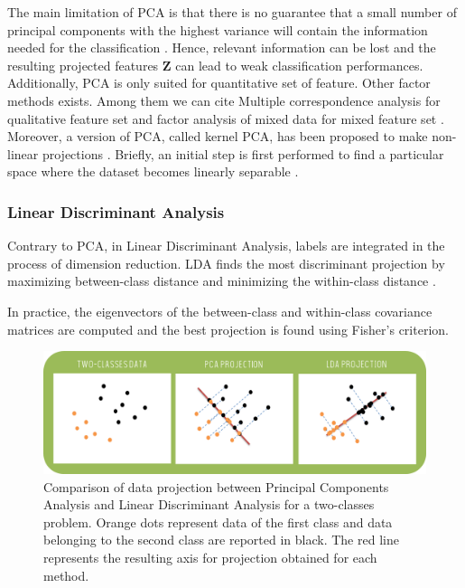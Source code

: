 \documentclass[a4paper,10pt]{article}
\begin{document}
The main limitation of PCA is that there is no guarantee that a small number of principal components with the highest variance will contain the information needed for the classification \cite{neal2006high}. Hence, relevant information can be lost and the resulting projected features $\bm{Z}$ can lead to weak classification performances.
Additionally, PCA is only suited for quantitative set of feature. Other factor methods exists. Among them we can cite Multiple correspondence analysis \cite{le2010multiple} for qualitative feature set and factor analysis of mixed data for mixed feature set \cite{escofier2008analyses}. Moreover, a version of PCA, called kernel PCA, has been proposed to make non-linear projections \cite{scholkopf1997kernel}. Briefly, an initial step is first performed to find a particular space where the dataset becomes linearly separable \cite{bonaccorso2017machine}.

\subsubsection{Linear Discriminant Analysis}
\label{LDAExtr}
Contrary to PCA, in Linear Discriminant Analysis, labels are integrated in the process of dimension reduction. LDA finds the most discriminant projection by maximizing between-class distance and minimizing the within-class distance \cite{balakrishnama1998linear}.

In practice, the eigenvectors of the between-class and within-class covariance matrices are computed and the best projection is found using Fisher's criterion.
\begin{figure}[htbp]
\centerline{\includegraphics[width=\linewidth]{./figures/comparaisonLDAPCA2.png}}
\caption{Comparison of data projection between Principal Components Analysis and Linear Discriminant Analysis for a two-classes problem. Orange dots represent data of the first class and data belonging to the second class are reported in black. The red line represents the resulting axis for projection obtained for each method.}
\label{CompLDAPCA}
\end{figure}
\end{document}
